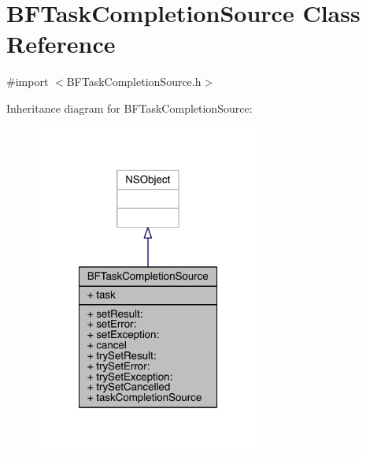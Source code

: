 \hypertarget{interface_b_f_task_completion_source}{\section{B\-F\-Task\-Completion\-Source Class Reference}
\label{interface_b_f_task_completion_source}
}


{\ttfamily \#import $<$B\-F\-Task\-Completion\-Source.\-h$>$}



Inheritance diagram for B\-F\-Task\-Completion\-Source\-:
\nopagebreak
\begin{figure}[H]
\begin{center}
\leavevmode
\includegraphics[width=210pt]{interface_b_f_task_completion_source__inherit__graph}
\end{center}
\end{figure}


